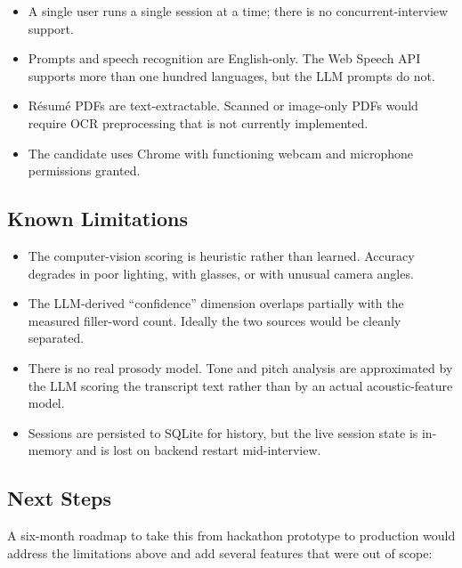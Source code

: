 \documentclass[11pt,a4paper]{article}
\begin{document}
\begin{itemize}
  \item A single user runs a single session at a time; there is no
        concurrent-interview support.
  \item Prompts and speech recognition are English-only. The Web Speech
        API supports more than one hundred languages, but the LLM prompts
        do not.
  \item Résumé PDFs are text-extractable. Scanned or image-only PDFs would
        require OCR preprocessing that is not currently implemented.
  \item The candidate uses Chrome with functioning webcam and microphone
        permissions granted.
\end{itemize}

\subsection{Known Limitations}

\begin{itemize}
  \item The computer-vision scoring is heuristic rather than learned.
        Accuracy degrades in poor lighting, with glasses, or with unusual
        camera angles.
  \item The LLM-derived ``confidence'' dimension overlaps partially with
        the measured filler-word count. Ideally the two sources would be
        cleanly separated.
  \item There is no real prosody model. Tone and pitch analysis are
        approximated by the LLM scoring the transcript text rather than
        by an actual acoustic-feature model.
  \item Sessions are persisted to SQLite for history, but the live session
        state is in-memory and is lost on backend restart mid-interview.
\end{itemize}

\subsection{Next Steps}

A six-month roadmap to take this from hackathon prototype to production
would address the limitations above and add several features that were
out of scope:
\end{document}
